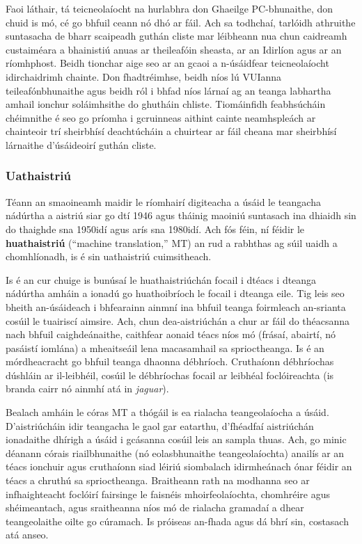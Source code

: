\begin{multicols}{2}
Faoi láthair, tá teicneolaíocht na hurlabhra don Ghaeilge PC-bhunaithe, don chuid is mó, cé go bhfuil ceann nó dhó ar fáil. Ach sa todhchaí, tarlóidh athruithe suntasacha de bharr scaipeadh guthán cliste mar léibheann nua chun caidreamh custaiméara a bhainistiú anuas ar theileafóin sheasta, ar an Idirlíon agus ar an ríomhphost. Beidh tionchar aige seo ar an gcaoi a n-úsáidfear teicneolaíocht idirchaidrimh chainte. Don fhadtréimhse, beidh níos lú VUIanna teileafónbhunaithe agus beidh ról i bhfad níos lárnaí ag an teanga labhartha amhail ionchur soláimhsithe do ghutháin chliste. Tiomáinfidh feabhsúcháin chéimnithe é seo go príomha i gcruinneas aithint cainte neamhspleách ar chainteoir trí sheirbhísí deachtúcháin a chuirtear ar fáil cheana mar sheirbhísí lárnaithe d’úsáideoirí guthán cliste.

\subsubsection{Uathaistriú}

Téann an smaoineamh maidir le ríomhairí digiteacha a úsáid le teangacha nádúrtha a aistriú siar go dtí 1946 agus tháinig maoiniú suntasach ina dhiaidh sin do thaighde sna 1950idí agus arís sna 1980idí. Ach fós féin, ní féidir le \textbf{huathaistriú} (``machine translation,'' MT) an rud a rabhthas ag súil uaidh a chomhlíonadh, is é sin uathaistriú cuimsitheach. 


Is é an cur chuige is bunúsaí le huathaistriúchán focail i dtéacs i dteanga nádúrtha amháin a ionadú go huathoibríoch le focail i dteanga eile. Tig leis seo bheith an-úsáideach i bhfearainn ainmní ina bhfuil teanga foirmleach an-srianta cosúil le tuairiscí aimsire. Ach, chun dea-aistriúchán a chur ar fáil do théacsanna nach bhfuil caighdeánaithe, caithfear aonaid téacs níos mó (frásaí, abairtí, nó pasáistí iomlána) a mheaitseáil lena macasamhail sa sprioctheanga. Is é an mórdheacracht go bhfuil teanga dhaonna débhríoch. Cruthaíonn débhríochas dúshláin ar il-leibhéil, cosúil le débhríochas focail ar leibhéal foclóireachta (is branda cairr nó ainmhí atá in \textit{jaguar}).

Bealach amháin le córas MT a thógáil is ea rialacha teangeolaíocha a úsáid. D’aistriúcháin idir teangacha le gaol gar eatarthu, d’fhéadfaí aistriúchán ionadaithe dhírigh a úsáid i gcásanna cosúil leis an sampla thuas. Ach, go minic déanann córais riailbhunaithe (nó eolasbhunaithe teangeolaíochta) anailís ar an téacs ionchuir agus cruthaíonn siad léiriú siombalach idirmheánach ónar féidir an téacs a chruthú sa sprioctheanga. Braitheann rath na modhanna seo ar infhaighteacht foclóirí fairsinge le faisnéis mhoirfeolaíochta, chomhréire agus shéimeantach, agus sraitheanna níos mó de rialacha gramadaí a dhear teangeolaithe oilte go cúramach. Is próiseas an-fhada agus dá bhrí sin, costasach atá anseo.


\end{multicols}
